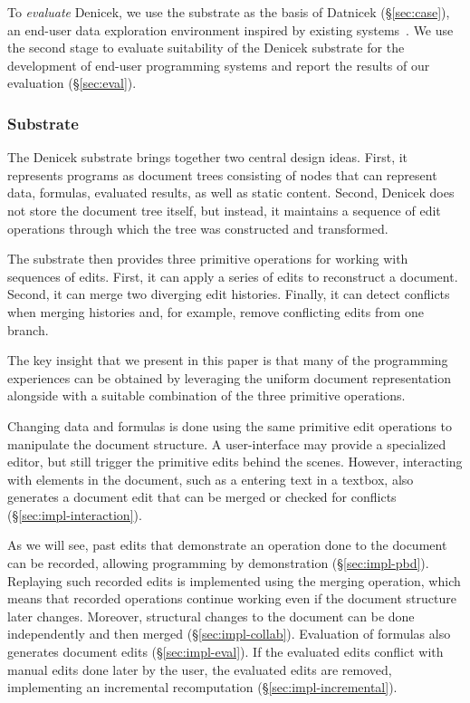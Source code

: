\documentclass[sigconf,anonymous,screen]{acmart}
\begin{document}
To \emph{evaluate} Denicek, we use the substrate as the basis of Datnicek (\S\ref{sec:case}), an end-user data
exploration environment inspired by existing systems~\cite{kandel-2011-wrangler,drossos-2020-wrex}.
We use the second stage to evaluate suitability of the Denicek substrate for the development of
end-user programming systems and report the results of our evaluation (\S\ref{sec:eval}).

\subsubsection*{Substrate}
The Denicek substrate brings together two central design ideas. First, it represents programs as
document trees consisting of nodes that can represent data, formulas, evaluated results, as well as
static content. Second, Denicek does not store the document tree itself, but instead, it maintains
a sequence of edit operations through which the tree was constructed and transformed.

The substrate then provides three primitive operations for working with sequences of edits.
First, it can apply a series of edits to reconstruct a document. Second, it can merge two
diverging edit histories. Finally, it can detect conflicts when merging histories and, for
example, remove conflicting edits from one branch.

The key insight that we present in this paper is that many of the programming experiences can
be obtained by leveraging the uniform document representation alongside with a suitable combination
of the three primitive operations.

Changing data and formulas is done using the same primitive edit operations to
manipulate the document structure. A user-interface may provide a specialized editor, but still
trigger the primitive edits behind the scenes. However, interacting with elements in the document,
such as a entering text in a textbox, also generates a document edit that can be merged or checked
for conflicts (\S\ref{sec:impl-interaction}).

As we will see, past edits that demonstrate an operation done to the
document can be recorded, allowing programming by demonstration (\S\ref{sec:impl-pbd}).  Replaying
such recorded edits is implemented using the merging operation, which means that recorded operations
continue working even if the document structure later changes. Moreover, structural changes to the
document can be done independently and then merged (\S\ref{sec:impl-collab}). Evaluation of formulas
also generates document edits (\S\ref{sec:impl-eval}). If the evaluated edits conflict with manual
edits done later by the user, the evaluated edits are removed, implementing an incremental
recomputation (\S\ref{sec:impl-incremental}).
\end{document}
